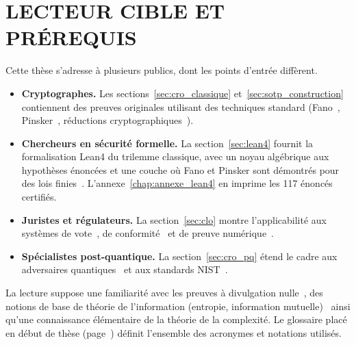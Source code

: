 \section{LECTEUR CIBLE ET PR\'EREQUIS}
\label{sec:ig_lecteur}
\begin{sloppypar}

Cette th\`ese s'adresse \`a plusieurs publics, dont les points d'entr\'ee diff\`erent.

\begin{itemize}
\item \textbf{Cryptographes.} Les sections~\ref{sec:cro_classique} et~\ref{sec:sotp_construction} contiennent des preuves originales utilisant des techniques standard (Fano~\cite{Fano61}, Pinsker~\cite{Pinsker1964}, r\'eductions cryptographiques~\cite{Shoup01,Damgard87}).

\item \textbf{Chercheurs en s\'ecurit\'e formelle.} La section~\ref{sec:lean4} fournit la formalisation Lean4 du trilemme classique, avec un noyau alg\'ebrique aux hypoth\`eses \'enonc\'ees et une couche o\`u Fano et Pinsker sont d\'emontr\'es pour des lois finies~\cite{BartheEA2013,Lochbihler2016,Affeldt2015}. L'annexe~\ref{chap:annexe_lean4} en imprime les 117 \'enonc\'es certifi\'es.

\item \textbf{Juristes et r\'egulateurs.} La section~\ref{sec:clo} montre l'applicabilit\'e aux syst\`emes de vote~\cite{Adida08,Benaloh94}, de conformit\'e~\cite{FATF12,AMLD4} et de preuve num\'erique~\cite{Mason07,Casey16}.

\item \textbf{Sp\'ecialistes post-quantique.} La section~\ref{sec:cro_pq} \'etend le cadre aux adversaires quantiques~\cite{Watrous2009,Unruh2016,Boneh2011} et aux standards NIST~\cite{NISTPQC,NISTPostQuantum2022}.
\end{itemize}

La lecture suppose une familiarit\'e avec les preuves \`a divulgation nulle~\cite{GMR85,BenSasson2019,Campanelli2019}, des notions de base de th\'eorie de l'information (entropie, information mutuelle)~\cite{CoverThomas06,Smith09} ainsi qu'une connaissance \'el\'ementaire de la th\'eorie de la complexit\'e. Le glossaire plac\'e en d\'ebut de th\`ese (page~\pageref{chap:glossaire}) d\'efinit l'ensemble des acronymes et notations utilis\'es.

\end{sloppypar}

